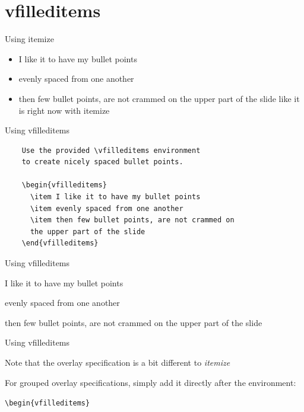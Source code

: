 \documentclass[aspectratio=169]{beamer}
\begin{document}
\section{vfilleditems}
\begin{frame}{Using itemize}
	\begin{itemize}
		\item I like it to have my bullet points
		\item evenly spaced from one another
		\item then few bullet points, are not crammed on
		      the upper part of the slide
		      like it is right now with itemize
	\end{itemize}
\end{frame}

\begin{frame}[fragile]{Using vfilleditems}
	\begin{verbatim}
    Use the provided \vfilleditems environment
    to create nicely spaced bullet points.

    \begin{vfilleditems}
      \item I like it to have my bullet points
      \item evenly spaced from one another
      \item then few bullet points, are not crammed on
      the upper part of the slide
    \end{vfilleditems}
    \end{verbatim}
\end{frame}

\begin{frame}{Using vfilleditems}
	\begin{vfilleditems}
		\item I like it to have my bullet points
		\item evenly spaced from one another
		\item then few bullet points, are not crammed on
		the upper part of the slide
	\end{vfilleditems}
\end{frame}

\begin{frame}{Using vfilleditems}
	\begin{vfilleditems}
		\item Note that the overlay specification
		is a bit different to \emph{itemize}
		\item For grouped overlay specifications, simply add it
		directly after the environment:
		\begin{vfilleditems}
			\item \texttt{\textbackslash{}begin\{vfilleditems\}<+->}
		\end{vfilleditems}
	\end{vfilleditems}
\end{frame}
\end{document}

